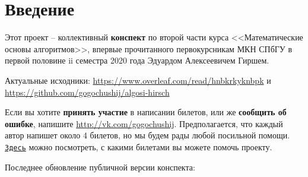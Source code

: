 \section*{Введение}

Этот проект -- коллективный \textbf{конспект} по второй части курса <<Математические основы алгоритмов>>, впервые прочитанного первокурсникам МКН СПбГУ в первой половине ii семестра 2020 года Эдуардом Алексеевичем Гиршем. 

Актуальные исходники: \url{https://www.overleaf.com/read/hnbkrkyknbpk} и \url{https://github.com/gogochushij/algosi-hirsch}

Если вы хотите \textbf{принять участие} в написании билетов, или же 
\textbf{сообщить об ошибке}, напишите \url{http://vk.com/gogochushij}. Предполагается, что каждый автор напишет около 4 билетов, но мы будем рады любой посильной помощи. \href{https://docs.google.com/spreadsheets/d/17MKhLVzCyYvEKlm6W5Bb-6uUDNyv0QLmdvuh4N6JfXI/edit?usp=sharing}{\texttt{Здесь}} можно посмотреть, с какими билетами вы можете помочь проекту.

Последнее обновление публичной версии конспекта: \date{\today}

